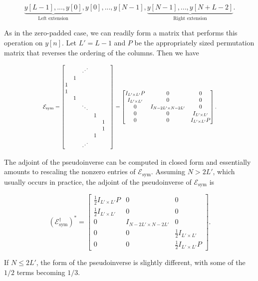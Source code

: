 \documentclass[journal]{IEEEtran}
\newcommand\scalemath[2]{\scalebox{#1}{\mbox{\ensuremath{\displaystyle #2}}}}
\begin{document}
\[ \underbrace{y[L-1], ..., y[0]}_\text{Left extension}, y[0], ..., y[N-1], \underbrace{y[N-1], ..., y[N+L-2]}_\text{Right extension}. \] 

\noindent As in the zero-padded case, we can readily form a matrix that performs this operation on $y[n]$.  Let $L'=L-1$ and $P$ be the appropriately sized permutation matrix that reverses the ordering of the columns.  Then we have

\[ \scalemath{0.8}{\mathcal{E}_\text{sym} = \begin{bmatrix} & & \iddots & & &\\ & 1 &&&&\\ 1&&&&&\\1&&&&\\&1&&&&\\&&\ddots&&&\\&&&1&\\&&&&1\\&&&&1\\&&&1&\\&&\iddots&&\end{bmatrix} = \begin{bmatrix}I_{L'\times L'}P & 0 & 0\\I_{L'\times L'} & 0 & 0\\0 & I_{N-2L'\times N-2L'} & 0\\0&0&I_{L'\times L'}\\0&0&I_{L'\times L'}P\end{bmatrix}.} \]

\noindent The adjoint of the pseudoinverse can be computed in closed form and essentially amounts to rescaling the nonzero entries of $\mathcal{E}_\text{sym}$.  Assuming $N > 2L'$, which usually occurs in practice, the adjoint of the  pseudoinverse of $\mathcal{E}_\text{sym}$ is 

\[ \left(\mathcal{E}_\text{sym}^\dagger\right)^\ast = \begin{bmatrix}\frac{1}{2}I_{L'\times L'}P & 0 & 0\\\frac{1}{2}I_{L'\times L'} & 0 & 0\\0 & I_{N-2L'\times N-2L'} & 0\\0&0&\frac{1}{2}I_{L'\times L'}\\0&0&\frac{1}{2}I_{L'\times L'}P\end{bmatrix}. \]

\noindent If ${N \le 2L'}$, the form of the pseudoinverse is slightly different, with some of the $1/2$ terms becoming $1/3$.\\%
\end{document}
